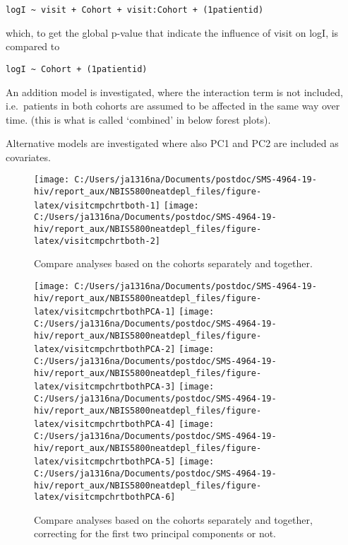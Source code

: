 \documentclass[
]{article}
\begin{document}
\texttt{logI\ \textasciitilde{}\ visit\ +\ Cohort\ +\ visit:Cohort\ +\ (1\textbar{}patientid)}

which, to get the global p-value that indicate the influence of visit on logI, is compared to

\texttt{logI\ \textasciitilde{}\ Cohort\ +\ (1\textbar{}patientid)}

An addition model is investigated, where the interaction term is not included, i.e.~patients in both cohorts are assumed to be affected in the same way over time. (this is what is called `combined' in below forest plots).

Alternative models are investigated where also PC1 and PC2 are included as covariates.

\begin{figure}
\texttt{[image: C:/Users/ja1316na/Documents/postdoc/SMS-4964-19-hiv/report\_aux/NBIS5800neatdepl\_files/figure-latex/visitcmpchrtboth-1]} \texttt{[image: C:/Users/ja1316na/Documents/postdoc/SMS-4964-19-hiv/report\_aux/NBIS5800neatdepl\_files/figure-latex/visitcmpchrtboth-2]} \caption{Compare analyses based on the cohorts separately and together.}\label{fig:visitcmpchrtboth}
\end{figure}

\begin{figure}
\texttt{[image: C:/Users/ja1316na/Documents/postdoc/SMS-4964-19-hiv/report\_aux/NBIS5800neatdepl\_files/figure-latex/visitcmpchrtbothPCA-1]} \texttt{[image: C:/Users/ja1316na/Documents/postdoc/SMS-4964-19-hiv/report\_aux/NBIS5800neatdepl\_files/figure-latex/visitcmpchrtbothPCA-2]} \texttt{[image: C:/Users/ja1316na/Documents/postdoc/SMS-4964-19-hiv/report\_aux/NBIS5800neatdepl\_files/figure-latex/visitcmpchrtbothPCA-3]} \texttt{[image: C:/Users/ja1316na/Documents/postdoc/SMS-4964-19-hiv/report\_aux/NBIS5800neatdepl\_files/figure-latex/visitcmpchrtbothPCA-4]} \texttt{[image: C:/Users/ja1316na/Documents/postdoc/SMS-4964-19-hiv/report\_aux/NBIS5800neatdepl\_files/figure-latex/visitcmpchrtbothPCA-5]} \texttt{[image: C:/Users/ja1316na/Documents/postdoc/SMS-4964-19-hiv/report\_aux/NBIS5800neatdepl\_files/figure-latex/visitcmpchrtbothPCA-6]} \caption{Compare analyses based on the cohorts separately and together, correcting for the first two principal components or not.}\label{fig:visitcmpchrtbothPCA}
\end{figure}
\end{document}
